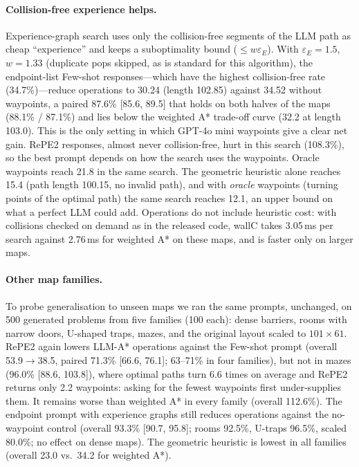 \documentclass[11pt]{article}
\begin{document}
\paragraph{Collision-free experience helps.}
Experience-graph search \citep{phillips2012egraphs} uses only the collision-free segments of the LLM path as cheap ``experience'' and keeps a suboptimality bound ($\le w\varepsilon_E$).
With $\varepsilon_E{=}1.5$, $w{=}1.33$ (duplicate pops skipped, as is standard for this algorithm), the endpoint-list Few-shot responses---which have the highest collision-free rate (34.7\%)---reduce operations to 30.24 (length 102.85) against 34.52 without waypoints, a paired 87.6\% [85.6, 89.5] that holds on both halves of the maps (88.1\% / 87.1\%) and lies below the weighted A* trade-off curve (32.2 at length 103.0).
This is the only setting in which GPT-4o mini waypoints give a clear net gain.
RePE2 responses, almost never collision-free, hurt in this search (108.3\%), so the best prompt depends on how the search uses the waypoints.
Oracle waypoints reach 21.8 in the same search.
The geometric heuristic alone reaches 15.4 (path length 100.15, no invalid path), and with \emph{oracle} waypoints (turning points of the optimal path) the same search reaches 12.1, an upper bound on what a perfect LLM could add.
Operations do not include heuristic cost: with collisions checked on demand as in the released code, wallC takes 3.05\,ms per search against 2.76\,ms for weighted A* on these maps, and is faster only on larger maps.

\paragraph{Other map families.}
To probe generalisation to unseen maps we ran the same prompts, unchanged, on 500 generated problems from five families (100 each): dense barriers, rooms with narrow doors, U-shaped traps, mazes, and the original layout scaled to $101\times61$.
RePE2 again lowers LLM-A* operations against the Few-shot prompt (overall 53.9$\rightarrow$38.5, paired 71.3\% [66.6, 76.1]; 63--71\% in four families), but not in mazes (96.0\% [88.6, 103.8]), where optimal paths turn 6.6 times on average and RePE2 returns only 2.2 waypoints: asking for the fewest waypoints first under-supplies them.
It remains worse than weighted A* in every family (overall 112.6\%).
The endpoint prompt with experience graphs still reduces operations against the no-waypoint control (overall 93.3\% [90.7, 95.8]; rooms 92.5\%, U-traps 96.5\%, scaled 80.0\%; no effect on dense maps).
The geometric heuristic is lowest in all families (overall 23.0 vs.\ 34.2 for weighted A*).
\end{document}

